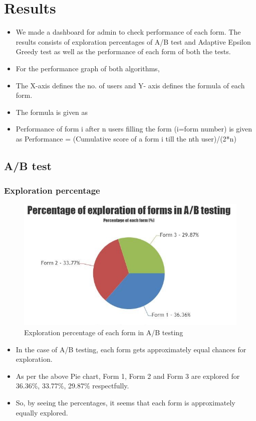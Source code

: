 \documentclass[12pt]{report}
\begin{document}
\chapter{Results}
\begin{itemize}
\item	We made a dashboard for admin to check performance of each form. The results consists of exploration percentages of A/B test and Adaptive Epsilon Greedy test as well as the performance of each form of both the tests.
\item	For the performance graph of both algorithms,
\item	The X-axis defines the no. of users and Y- axis defines the formula of each form.
\item	The formula is given as

\item	Performance of form i after n users filling the form (i=form number) is given as\newline
Performance = (Cumulative score of a form i till the nth user)/(2*n)
\end{itemize}
\section{ A/B test}

\subsection{Exploration percentage}
\begin{figure}[H]
\includegraphics[scale=1]{abtestpie.jpg}
\caption{Exploration percentage of each form in A/B testing}
\end{figure}
\begin{itemize}
\item	In the case of A/B testing, each form gets approximately equal chances for exploration.
\item	As per the above Pie chart, Form 1, Form 2 and Form 3 are explored for 36.36\%, 33.77\%, 29.87\% respectfully.
\item	So, by seeing the percentages, it seems that each form is approximately equally explored.
\end{itemize}
\end{document}
